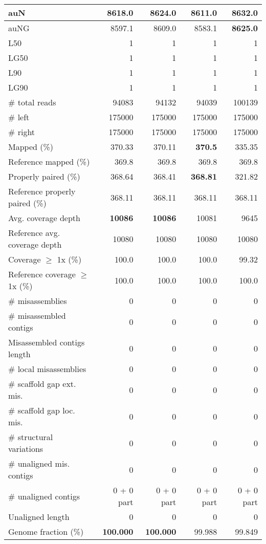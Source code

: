\documentclass[12pt,a4paper]{article}
\begin{document}
\begin{table}[ht]
\begin{center}
\begin{tabular}{|l*{4}{|r}|}
auN & 8618.0 & 8624.0 & 8611.0 & {\bf 8632.0} \\ \hline
auNG & 8597.1 & 8609.0 & 8583.1 & {\bf 8625.0} \\ \hline
L50 & 1 & 1 & 1 & 1 \\ \hline
LG50 & 1 & 1 & 1 & 1 \\ \hline
L90 & 1 & 1 & 1 & 1 \\ \hline
LG90 & 1 & 1 & 1 & 1 \\ \hline
\# total reads & 94083 & 94132 & 94039 & 100139 \\ \hline
\# left & 175000 & 175000 & 175000 & 175000 \\ \hline
\# right & 175000 & 175000 & 175000 & 175000 \\ \hline
Mapped (\%) & 370.33 & 370.11 & {\bf 370.5} & 335.35 \\ \hline
Reference mapped (\%) & 369.8 & 369.8 & 369.8 & 369.8 \\ \hline
Properly paired (\%) & 368.64 & 368.41 & {\bf 368.81} & 321.82 \\ \hline
Reference properly paired (\%) & 368.11 & 368.11 & 368.11 & 368.11 \\ \hline
Avg. coverage depth & {\bf 10086} & {\bf 10086} & 10081 & 9645 \\ \hline
Reference avg. coverage depth & 10080 & 10080 & 10080 & 10080 \\ \hline
Coverage $\geq$ 1x (\%) & 100.0 & 100.0 & 100.0 & 99.32 \\ \hline
Reference coverage $\geq$ 1x (\%) & 100.0 & 100.0 & 100.0 & 100.0 \\ \hline
\# misassemblies & 0 & 0 & 0 & 0 \\ \hline
\# misassembled contigs & 0 & 0 & 0 & 0 \\ \hline
Misassembled contigs length & 0 & 0 & 0 & 0 \\ \hline
\# local misassemblies & 0 & 0 & 0 & 0 \\ \hline
\# scaffold gap ext. mis. & 0 & 0 & 0 & 0 \\ \hline
\# scaffold gap loc. mis. & 0 & 0 & 0 & 0 \\ \hline
\# structural variations & 0 & 0 & 0 & 0 \\ \hline
\# unaligned mis. contigs & 0 & 0 & 0 & 0 \\ \hline
\# unaligned contigs & 0 + 0 part & 0 + 0 part & 0 + 0 part & 0 + 0 part \\ \hline
Unaligned length & 0 & 0 & 0 & 0 \\ \hline
Genome fraction (\%) & {\bf 100.000} & {\bf 100.000} & 99.988 & 99.849 \\ \hline

\end{tabular}
\end{center}
\end{table}
\end{document}
